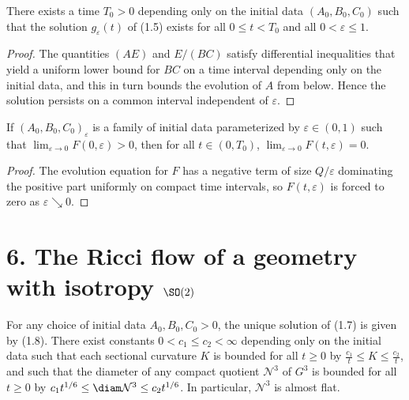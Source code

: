 \begin{lemma}
\label{ch01-lem-common-time-interval}

There exists a time $T_0>0$ depending only on the initial data $(A_0,B_0,C_0)$ such that the solution $g_\varepsilon(t)$ of (1.5) exists for all $0\le t<T_0$ and all $0<\varepsilon\le 1$.
\end{lemma}

\begin{proof}
\sketch The quantities $(AE)$ and $E/(BC)$ satisfy differential inequalities that yield a uniform lower bound for $BC$ on a time interval depending only on the initial data, and this in turn bounds the evolution of $A$ from below. Hence the solution persists on a common interval independent of $\varepsilon$.
\end{proof}

\begin{lemma}
\label{ch01-lem-collapse-discontinuity}

If $(A_0,B_0,C_0)_\varepsilon$ is a family of initial data parameterized by $\varepsilon\in(0,1)$ such that $\lim_{\varepsilon\to 0}F(0,\varepsilon)>0$, then for all $t\in(0,T_0)$, $\lim_{\varepsilon\to 0}F(t,\varepsilon)=0$.
\end{lemma}

\begin{proof}
\sketch The evolution equation for $F$ has a negative term of size $Q/\varepsilon$ dominating the positive part uniformly on compact time intervals, so $F(t,\varepsilon)$ is forced to zero as $\varepsilon\searrow 0$.
\end{proof}

\section*{6. The Ricci flow of a geometry with isotropy $\SO(2)$}

\begin{proposition}
\label{ch01-prop-nil}

For any choice of initial data $A_0,B_0,C_0 > 0$, the unique solution of (1.7) is given by (1.8). There exist constants $0 < c_1 \leq c_2 < \infty$ depending only on the initial data such that each sectional curvature $K$ is bounded for all $t \geq 0$ by $\frac{c_1}{t} \leq K \leq \frac{c_2}{t}$, and such that the diameter of any compact quotient $\mathcal{N}^3$ of $G^3$ is bounded for all $t \geq 0$ by $c_1 t^{1/6} \leq \diam \mathcal{N}^3 \leq c_2 t^{1/6}$. In particular, $\mathcal{N}^3$ is almost flat.
\end{proposition}

